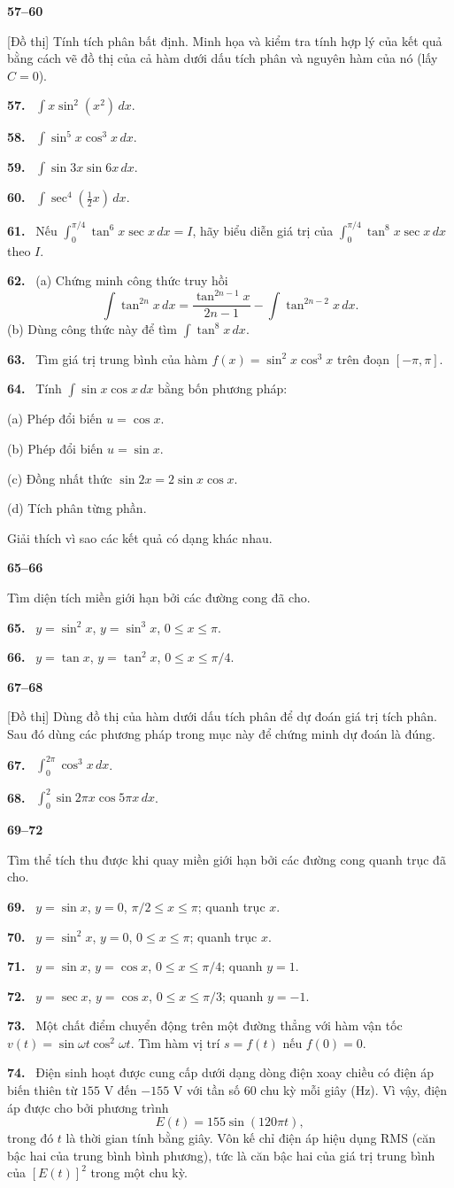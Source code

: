 \documentclass[12pt,a4paper]{article}
\newcommand{\bt}[1]{\par\smallskip\Needspace{5\baselineskip}\noindent\textbf{#1.}\ }
\newcommand{\group}[1]{\par\Needspace{11\baselineskip}\medskip\noindent\textbf{#1}\par\nopagebreak[4]}
\begin{document}
\group{57–60} \textsf{[Đồ thị]} Tính tích phân bất định. Minh họa và kiểm tra tính hợp lý của kết quả bằng cách vẽ đồ thị của cả hàm dưới dấu tích phân và nguyên hàm của nó (lấy $C=0$).
\bt{57} $\displaystyle\int x\sin^2(x^2)\,dx$.
\bt{58} $\displaystyle\int\sin^5x\cos^3x\,dx$.
\bt{59} $\displaystyle\int\sin3x\sin6x\,dx$.
\bt{60} $\displaystyle\int\sec^4\left(\frac12x\right)\,dx$.

\bt{61} Nếu $\int_0^{\pi/4}\tan^6x\sec x\,dx=I$, hãy biểu diễn giá trị của $\int_0^{\pi/4}\tan^8x\sec x\,dx$ theo $I$.

\bt{62} (a) Chứng minh công thức truy hồi
\[\int\tan^{2n}x\,dx=\frac{\tan^{2n-1}x}{2n-1}-\int\tan^{2n-2}x\,dx.\]
(b) Dùng công thức này để tìm $\int\tan^8x\,dx$.

\bt{63} Tìm giá trị trung bình của hàm $f(x)=\sin^2x\cos^3x$ trên đoạn $[-\pi,\pi]$.

\bt{64} Tính $\int\sin x\cos x\,dx$ bằng bốn phương pháp:

(a) Phép đổi biến $u=\cos x$.

(b) Phép đổi biến $u=\sin x$.

(c) Đồng nhất thức $\sin2x=2\sin x\cos x$.

(d) Tích phân từng phần.

Giải thích vì sao các kết quả có dạng khác nhau.

\group{65–66} Tìm diện tích miền giới hạn bởi các đường cong đã cho.
\bt{65} $y=\sin^2x$, $y=\sin^3x$, $0\le x\le\pi$.
\bt{66} $y=\tan x$, $y=\tan^2x$, $0\le x\le\pi/4$.

\group{67–68} \textsf{[Đồ thị]} Dùng đồ thị của hàm dưới dấu tích phân để dự đoán giá trị tích phân. Sau đó dùng các phương pháp trong mục này để chứng minh dự đoán là đúng.
\bt{67} $\displaystyle\int_0^{2\pi}\cos^3x\,dx$.
\bt{68} $\displaystyle\int_0^2\sin2\pi x\cos5\pi x\,dx$.

\group{69–72} Tìm thể tích thu được khi quay miền giới hạn bởi các đường cong quanh trục đã cho.
\bt{69} $y=\sin x$, $y=0$, $\pi/2\le x\le\pi$; quanh trục $x$.
\bt{70} $y=\sin^2x$, $y=0$, $0\le x\le\pi$; quanh trục $x$.
\bt{71} $y=\sin x$, $y=\cos x$, $0\le x\le\pi/4$; quanh $y=1$.
\bt{72} $y=\sec x$, $y=\cos x$, $0\le x\le\pi/3$; quanh $y=-1$.

\bt{73} Một chất điểm chuyển động trên một đường thẳng với hàm vận tốc $v(t)=\sin\omega t\cos^2\omega t$. Tìm hàm vị trí $s=f(t)$ nếu $f(0)=0$.

\bt{74} Điện sinh hoạt được cung cấp dưới dạng dòng điện xoay chiều có điện áp biến thiên từ $155$ V đến $-155$ V với tần số $60$ chu kỳ mỗi giây (Hz). Vì vậy, điện áp được cho bởi phương trình
\[E(t)=155\sin(120\pi t),\]
trong đó $t$ là thời gian tính bằng giây. Vôn kế chỉ điện áp hiệu dụng RMS (căn bậc hai của trung bình bình phương), tức là căn bậc hai của giá trị trung bình của $[E(t)]^2$ trong một chu kỳ.
\end{document}

